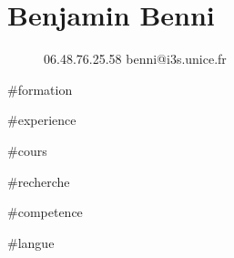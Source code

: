 \documentclass{tccv}
\begin{document}
\part{Benjamin Benni}
\begin{figure}[t]
    {06.48.76.25.58}
    {benni@i3s.unice.fr}
\end{figure}

#{formation}

#{experience}

#{cours}

#{recherche}

\vspace{-6pt} %
#{competence}

#{langue}
\end{document}
